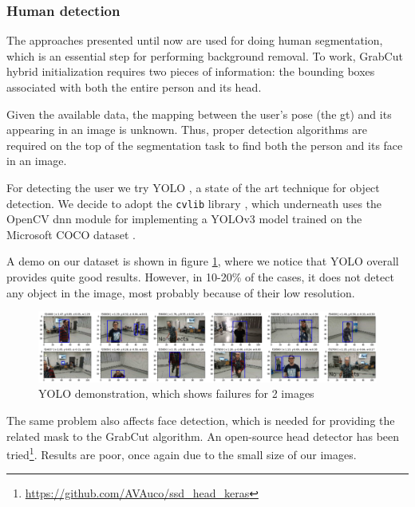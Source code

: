 \subsubsection{Human detection}
\label{subsec:masking-yolo}

The approaches presented until now are used for doing human segmentation, which is an essential step for performing background removal. To work, GrabCut hybrid initialization requires two pieces of information: the bounding boxes associated with both the entire person and its head.

Given the available data, the mapping between the user's pose (the \gls{gt}) and its appearing in an image is unknown. Thus, proper detection algorithms are required on the top of the segmentation task to find both the person and its face in an image.

\medskip

For detecting the user we try YOLO \cite{redmon2016look}, a state of the art technique for object detection. We decide to adopt the \texttt{cvlib} library \cite{cvlib}, which underneath uses the OpenCV dnn module \cite{opencv_dnn} for implementing a YOLOv3 model trained on the Microsoft COCO dataset \cite{lin2015microsoft}.

A demo on our dataset is shown in figure \ref{fig:yolo}, where we notice that YOLO overall provides quite good results. However, in 10-20\% of the cases, it does not detect any object in the image, most probably because of their low resolution.

\begin{figure}[!h]
	\centering
	\includegraphics[width=1\textwidth]{"contents/images/04-3yolo"}
	\caption[YOLO demonstration, which shows failures for 2 images]{YOLO demonstration, which shows failures for 2 images}
	\label{fig:yolo}
\end{figure}

The same problem also affects face detection, which is needed for providing the related mask to the GrabCut algorithm. An open-source head detector has been tried\footnote{\url{https://github.com/AVAuco/ssd_head_keras}}. Results are poor, once again due to the small size of our images.



